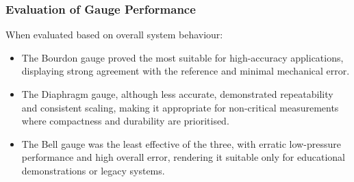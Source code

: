 \documentclass{article}
\begin{document}
\subsubsection{Evaluation of Gauge Performance}
When evaluated based on overall system behaviour:
\begin{itemize}
	\item The Bourdon gauge proved the most suitable for high-accuracy applications, displaying strong agreement with the reference and minimal mechanical error.
	\item The Diaphragm gauge, although less accurate, demonstrated repeatability and consistent scaling, making it appropriate for non-critical measurements where compactness and durability are prioritised.
	\item The Bell gauge was the least effective of the three, with erratic low-pressure performance and high overall error, rendering it suitable only for educational demonstrations or legacy systems.
\end{itemize}
\end{document}
